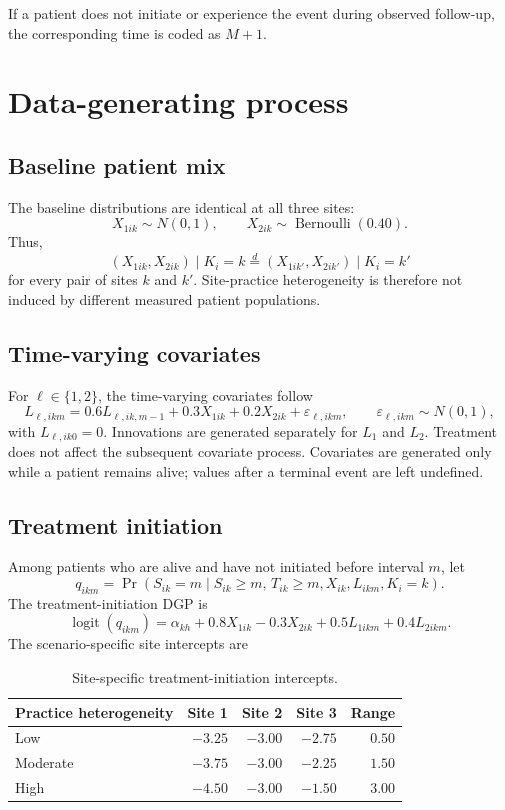 \documentclass[11pt]{article}
\newcommand{\Prb}{\operatorname{Pr}}
\begin{document}
If a patient does not initiate or experience the event during observed
follow-up, the corresponding time is coded as $M+1$.

\section{Data-generating process}

\subsection{Baseline patient mix}

The baseline distributions are identical at all three sites:
\[
  X_{1ik}\sim N(0,1),
  \qquad
  X_{2ik}\sim\operatorname{Bernoulli}(0.40).
\]
Thus,
\[
  (X_{1ik},X_{2ik})\mid K_i=k
  \overset{d}{=}
  (X_{1ik'},X_{2ik'})\mid K_i=k'
\]
for every pair of sites $k$ and $k'$. Site-practice heterogeneity is
therefore not induced by different measured patient populations.

\subsection{Time-varying covariates}

For $\ell\in\{1,2\}$, the time-varying covariates follow
\[
  L_{\ell,ikm}
  =0.6L_{\ell,ik,m-1}
   +0.3X_{1ik}
   +0.2X_{2ik}
   +\varepsilon_{\ell,ikm},
  \qquad
  \varepsilon_{\ell,ikm}\sim N(0,1),
\]
with $L_{\ell,ik0}=0$. Innovations are generated separately for $L_1$ and
$L_2$. Treatment does not affect the subsequent covariate process. Covariates
are generated only while a patient remains alive; values after a terminal
event are left undefined.

\subsection{Treatment initiation}

Among patients who are alive and have not initiated before interval $m$, let
\[
  q_{ikm}
  =\Prb(S_{ik}=m\mid S_{ik}\geq m,\,T_{ik}\geq m,
                         X_{ik},L_{ikm},K_i=k).
\]
The treatment-initiation DGP is
\begin{equation}
\label{eq:init-dgp}
  \operatorname{logit}(q_{ikm})
  =\alpha_{kh}
   +0.8X_{1ik}
   -0.3X_{2ik}
   +0.5L_{1ikm}
   +0.4L_{2ikm}.
\end{equation}
The scenario-specific site intercepts are
\begin{table}[ht]
\centering
\caption{Site-specific treatment-initiation intercepts.}
\begin{tabular}{lrrrr}
\toprule
Practice heterogeneity & Site 1 & Site 2 & Site 3 & Range \\
\midrule
Low      & $-3.25$ & $-3.00$ & $-2.75$ & $0.50$ \\
Moderate & $-3.75$ & $-3.00$ & $-2.25$ & $1.50$ \\
High     & $-4.50$ & $-3.00$ & $-1.50$ & $3.00$ \\
\bottomrule
\end{tabular}
\end{table}
\end{document}
